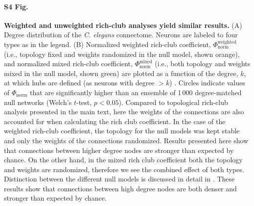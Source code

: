 \documentclass[10pt,letterpaper]{article}
\begin{document}
\paragraph*{S4 Fig.}
\label{S4_Fig}
{\bf Weighted and unweighted rich-club analyses yield similar results.}
   (A) Degree distribution of the \emph{C. elegans} connectome.
    Neurons are labeled to four types as in the legend.
    (B)
    Normalized weighted rich-club coefficient, $\Phi_\mathrm{norm}^\mathrm{weighted}$ (i.e., topology fixed and weights randomized in the null model, shown orange), and
    normalized mixed rich-club coefficient, $\Phi_\mathrm{norm}^\mathrm{mixed}$ (i.e., both topology and weights mixed in the null model, shown green) are plotted as a function of the degree, $k$, at which hubs are defined (as neurons with degree $>k$) \cite{Alstott2014}.
    Circles indicate values of $\Phi_\mathrm{norm}$ that are significantly higher than an ensemble of 1\,000 degree-matched null networks (Welch's $t$-test, $p < 0.05$).
    Compared to topological rich-club analysis presented in the main text, here the weights of the connections are also accounted for when calculating the rich club coefficient.
    In the case of the weighted rich-club coefficient, the topology for the null models was kept stable and only the weights of the connections randomized. Results presented here show that connections between higher degree nodes are stronger than expected by chance.
    On the other hand, in the mixed rich club coefficient both the topology and weights are randomized, therefore we see the combined effect of both types.
    Distinction between the different null models is discussed in detail in \cite{Alstott2014}.
    These results show that connections between high degree nodes are both denser and stronger than expected by chance.
\end{document}
